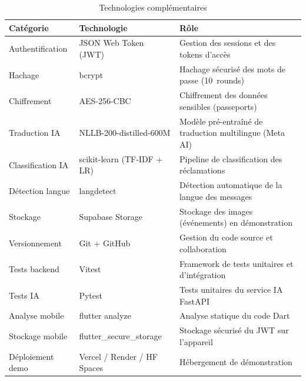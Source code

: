 \begin{table}[H]
\centering
\caption{Technologies complémentaires}
\small
\begin{tabularx}{\textwidth}{|p{2.5cm}|p{3.5cm}|X|}
\hline
\textbf{Catégorie} & \textbf{Technologie} & \textbf{Rôle} \\ \hline
Authentification & JSON Web Token (JWT) & Gestion des sessions et des tokens d'accès \\ \hline
Hachage & bcrypt & Hachage sécurisé des mots de passe (10~rounds) \\ \hline
Chiffrement & AES-256-CBC & Chiffrement des données sensibles (passeports) \\ \hline
Traduction IA & NLLB-200-distilled-600M & Modèle pré-entraîné de traduction multilingue (Meta AI) \\ \hline
Classification IA & scikit-learn (TF-IDF + LR) & Pipeline de classification des réclamations \\ \hline
Détection langue & langdetect & Détection automatique de la langue des messages \\ \hline
Stockage & Supabase Storage & Stockage des images (événements) en démonstration \\ \hline
Versionnement & Git + GitHub & Gestion du code source et collaboration \\ \hline
Tests backend & Vitest & Framework de tests unitaires et d'intégration \\ \hline
Tests IA & Pytest & Tests unitaires du service IA FastAPI \\ \hline
Analyse mobile & flutter analyze & Analyse statique du code Dart \\ \hline
Stockage mobile & flutter\_secure\_storage & Stockage sécurisé du JWT sur l'appareil \\ \hline
Déploiement demo & Vercel / Render / HF Spaces & Hébergement de démonstration \\ \hline
\end{tabularx}
\label{tab:technologies_complementaires}
\end{table}
\FloatBarrier
